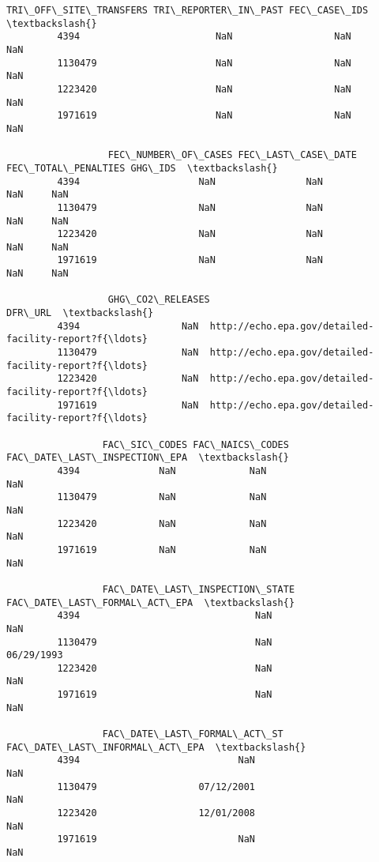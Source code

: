 \documentclass[11pt]{article}
\begin{document}
\begin{Verbatim}[commandchars=\\\{\}]
                  TRI\_OFF\_SITE\_TRANSFERS TRI\_REPORTER\_IN\_PAST FEC\_CASE\_IDS  \textbackslash{}
         4394                        NaN                  NaN          NaN   
         1130479                     NaN                  NaN          NaN   
         1223420                     NaN                  NaN          NaN   
         1971619                     NaN                  NaN          NaN   
         
                  FEC\_NUMBER\_OF\_CASES FEC\_LAST\_CASE\_DATE  FEC\_TOTAL\_PENALTIES GHG\_IDS  \textbackslash{}
         4394                     NaN                NaN                  NaN     NaN   
         1130479                  NaN                NaN                  NaN     NaN   
         1223420                  NaN                NaN                  NaN     NaN   
         1971619                  NaN                NaN                  NaN     NaN   
         
                  GHG\_CO2\_RELEASES                                            DFR\_URL  \textbackslash{}
         4394                  NaN  http://echo.epa.gov/detailed-facility-report?f{\ldots}   
         1130479               NaN  http://echo.epa.gov/detailed-facility-report?f{\ldots}   
         1223420               NaN  http://echo.epa.gov/detailed-facility-report?f{\ldots}   
         1971619               NaN  http://echo.epa.gov/detailed-facility-report?f{\ldots}   
         
                 FAC\_SIC\_CODES FAC\_NAICS\_CODES FAC\_DATE\_LAST\_INSPECTION\_EPA  \textbackslash{}
         4394              NaN             NaN                          NaN   
         1130479           NaN             NaN                          NaN   
         1223420           NaN             NaN                          NaN   
         1971619           NaN             NaN                          NaN   
         
                 FAC\_DATE\_LAST\_INSPECTION\_STATE FAC\_DATE\_LAST\_FORMAL\_ACT\_EPA  \textbackslash{}
         4394                               NaN                          NaN   
         1130479                            NaN                   06/29/1993   
         1223420                            NaN                          NaN   
         1971619                            NaN                          NaN   
         
                 FAC\_DATE\_LAST\_FORMAL\_ACT\_ST FAC\_DATE\_LAST\_INFORMAL\_ACT\_EPA  \textbackslash{}
         4394                            NaN                            NaN   
         1130479                  07/12/2001                            NaN   
         1223420                  12/01/2008                            NaN   
         1971619                         NaN                            NaN   
         

\end{Verbatim}
\end{document}
